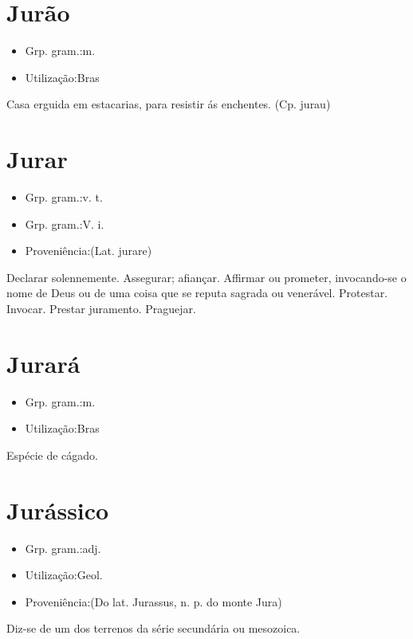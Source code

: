 \documentclass{article}
\begin{document}
\section{Jurão}
\begin{itemize}
\item {Grp. gram.:m.}
\end{itemize}
\begin{itemize}
\item {Utilização:Bras}
\end{itemize}
Casa erguida em estacarias, para resistir ás enchentes.
(Cp. \textunderscore jurau\textunderscore )
\section{Jurar}
\begin{itemize}
\item {Grp. gram.:v. t.}
\end{itemize}
\begin{itemize}
\item {Grp. gram.:V. i.}
\end{itemize}
\begin{itemize}
\item {Proveniência:(Lat. \textunderscore jurare\textunderscore )}
\end{itemize}
Declarar solennemente.
Assegurar; afiançar.
Affirmar ou prometer, invocando-se o nome de Deus ou de uma coisa que se reputa sagrada ou venerável.
Protestar.
Invocar.
Prestar juramento.
Praguejar.
\section{Jurará}
\begin{itemize}
\item {Grp. gram.:m.}
\end{itemize}
\begin{itemize}
\item {Utilização:Bras}
\end{itemize}
Espécie de cágado.
\section{Jurássico}
\begin{itemize}
\item {Grp. gram.:adj.}
\end{itemize}
\begin{itemize}
\item {Utilização:Geol.}
\end{itemize}
\begin{itemize}
\item {Proveniência:(Do lat. \textunderscore Jurassus\textunderscore , n. p. do monte Jura)}
\end{itemize}
Diz-se de um dos terrenos da série secundária ou mesozoica.
\end{document}
